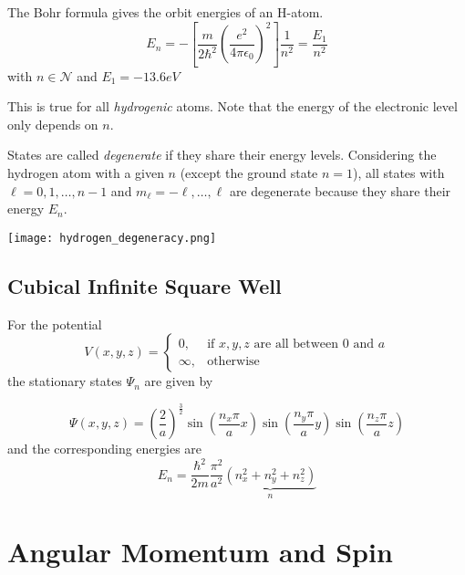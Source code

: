 \newpar{}

The Bohr formula gives the orbit energies of an H-atom.
\begin{equation*}
    E_n = -\left[\frac{m}{2\hbar^2}{\left(\frac{e^2}{4\pi\epsilon_0}\right)}^2\right]\frac{1}{n^2} = \frac{E_1}{n^2}
\end{equation*}
with $n \in \mathcal{N}$ and $E_1 = -13.6eV$

This is true for all \textit{hydrogenic} atoms. Note that the energy of the electronic level only depends on $n$.

\newpar{}

States are called \textit{degenerate} if they share their energy levels.
Considering the hydrogen atom with a given $n$ (except the ground state $n=1$), all states with $\ell=0,1,\ldots, n-1$ and $m_\ell=-\ell, \ldots, \ell$ are degenerate because they share their energy $E_n$.
\begin{center}
    \texttt{[image: hydrogen\_degeneracy.png]}
\end{center}

\subsection{Cubical Infinite Square Well}
For the potential
\noindent\begin{equation*}
    V(x,y,z)=\begin{cases}0,&\text{if }x,y,z\text{ are all between }0\text{ and }a\\\infty,&\text{otherwise}\end{cases}
\end{equation*}
the stationary states $\Psi_n$ are given by

\noindent\begin{equation*}
    \Psi \left(x,y,z\right)={\left(\frac{2}{a}\right)}^{\frac{3}{2}} \sin\left(\frac{n_{x}\pi}{a}x\right)\sin\left(\frac{n_{y}\pi}{a}y\right)\sin\left(\frac{n_{z}\pi}{a}z\right)
\end{equation*}
and the corresponding energies are
\noindent\begin{equation*}
    E_n = \frac{\hbar^{2}}{2m} \frac{\pi^{2}}{a^{2}} \underbrace{\left(n_{x}^{2}+n_{y}^{2}+n_{z}^{2}\right)}_{n}
\end{equation*}

\section{Angular Momentum and Spin}
